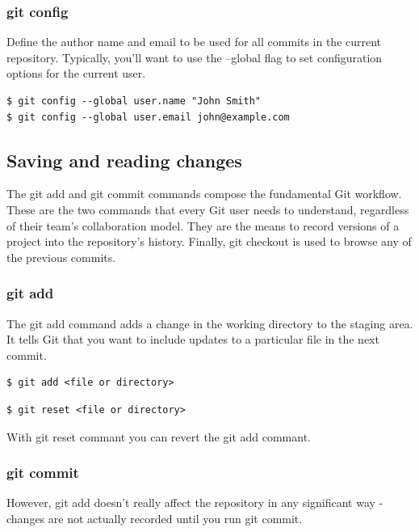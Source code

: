 \documentclass{article}
\begin{document}
\subsubsection*{git config}

Define the author name and email to be used for all commits in the current
repository. Typically, you'll want to use the --global flag to set
configuration options for the current user.

\begin{lstlisting}
$ git config --global user.name "John Smith"
$ git config --global user.email john@example.com 
\end{lstlisting}

\subsection{Saving and reading changes}

The git add and git commit commands compose the fundamental Git
workflow. These are the two commands that every Git user needs to
understand, regardless of their team's collaboration model. They are
the means to record versions of a project into the repository's
history. Finally, git checkout is used to browse any of the previous
commits.

\subsubsection*{git add}

The git add command adds a change in the working directory to the
staging area. It tells Git that you want to include updates to a
particular file in the next commit. 

\begin{lstlisting}
$ git add <file or directory> 
\end{lstlisting}

\begin{lstlisting}
$ git reset <file or directory> 
\end{lstlisting}

With git reset commant you can revert the git add commant.

\subsubsection*{git commit}

However, git add doesn't really
affect the repository in any significant way - changes are not actually
recorded until you run git commit. 
\end{document}
